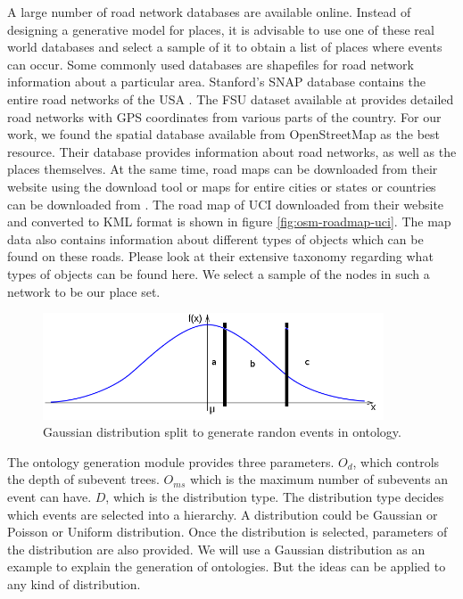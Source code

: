 A large number of road network databases are available online. Instead of designing a generative model for places, it is advisable to use one of these real world databases and select a sample of it to obtain a list of places where events can occur. Some commonly used databases are shapefiles \cite{esri:tigerline} for road network information about a particular area. Stanford's SNAP database contains the entire road networks of the USA \cite{stanford:snap}. The FSU dataset available at \cite{fsu:spatial} provides detailed road networks with GPS coordinates from various parts of the country. For our work, we found the spatial database available from OpenStreetMap as the best resource. Their database provides information about road networks, as well as the places themselves. At the same time, road maps can be downloaded from their website using the download tool or maps for entire cities or states or countries can be downloaded from \cite{cloudmade:download}. The road map of UCI downloaded from their website and converted to KML format is shown in figure \ref{fig:osm-roadmap-uci}. The map data also contains information about different types of objects which can be found on these roads. Please look at their extensive taxonomy \cite{osm:taxonomy} regarding what types of objects can be found here. We select a sample of the nodes in such a network to be our place set.


\begin{figure}[t]
\centering
\includegraphics[width=0.9\textwidth]{media/chapter5/perf/gaussian-split.png}
\caption{Gaussian distribution split to generate randon events in ontology.}
\label{fig:gaussian-split}
\end{figure}


The ontology generation module provides three parameters. $O_d$, which controls the depth of subevent trees. $O_{ms}$ which is the maximum number of subevents an event can have. $D$, which is the distribution type. The distribution type decides which events are selected into a hierarchy. A distribution could be Gaussian or Poisson or Uniform distribution. Once the distribution is selected, parameters of the distribution are also provided. We will use a Gaussian distribution as an example to explain the generation of ontologies. But the ideas can be applied to any kind of distribution. 

